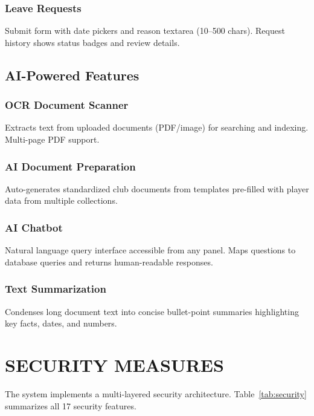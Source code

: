 \documentclass[12pt,a4paper,oneside]{report}
\begin{document}
\subsection{Leave Requests}
Submit form with date pickers and reason textarea (10--500 chars). Request history shows status badges and review details.

\section{AI-Powered Features}

\subsection{OCR Document Scanner}
Extracts text from uploaded documents (PDF/image) for searching and indexing. Multi-page PDF support.

\subsection{AI Document Preparation}
Auto-generates standardized club documents from templates pre-filled with player data from multiple collections.

\subsection{AI Chatbot}
Natural language query interface accessible from any panel. Maps questions to database queries and returns human-readable responses.

\subsection{Text Summarization}
Condenses long document text into concise bullet-point summaries highlighting key facts, dates, and numbers.


\chapter{SECURITY MEASURES}

The system implements a multi-layered security architecture. Table~\ref{tab:security} summarizes all 17 security features.
\end{document}
